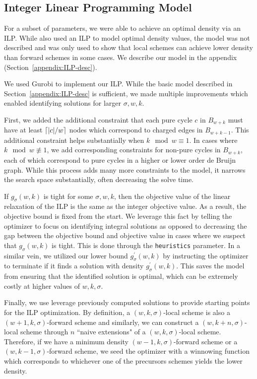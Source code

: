\documentclass{article}
\DeclarePairedDelimiter\ceil{\lceil}{\rceil}
\begin{document}
\subsection{Integer Linear Programming Model}
For a subset of parameters, we were able to achieve an optimal density via an ILP. While \cite{marccais2018asymptotically} also used an ILP to model optimal density values, the model was not described and was only used to show that local schemes can achieve lower density than forward schemes in some cases. We describe our model in the appendix (Section~\ref{appendix:ILP-desc}). 

We used Gurobi\citep{gurobi} to implement our ILP. While the basic model described in Section~\ref{appendix:ILP-desc} is sufficient, we made multiple improvements which enabled identifying solutions for larger $\sigma, w, k$. 

First, we added the additional constraint that each pure cycle $c$ in $B_{w+k}$  must have at least $\ceil*{{|c|}/{w}}$ nodes which correspond to charged edges in $B_{w+k-1}$. This additional constraint helps substantially when $k\mod w \equiv 1$. In cases where $k \mod w \not\equiv 1$, we add corresponding constraints for non-pure cycles in $B_{w+k}$, each of which correspond to pure cycles in a higher or lower order de Bruijn graph. While this process adds many more constraints to the model, it narrows the search space substantially, often decreasing the solve time.

If $g_\sigma(w, k)$ is tight for some $\sigma, w, k$, then the objective value of the linear relaxation of the ILP is the same as the integer objective value. As a result, the objective bound is fixed from the start. We leverage this fact by telling the optimizer to focus on identifying integral solutions as opposed to decreasing the gap between the objective bound and objective value in cases where we suspect that  $g_\sigma(w, k)$ is tight. This is done through the \texttt{heuristics} parameter. In a similar vein, we utilized our lower bound $g^\prime_\sigma(w,k)$ by instructing the optimizer to terminate if it finds a solution with density $g^\prime_\sigma(w,k)$. This saves the model from ensuring that the identified solution is optimal, which can be extremely costly at higher values of $w, k, \sigma$.

Finally, we use leverage previously computed solutions to provide starting points for the ILP optimization. By definition, a $(w, k, \sigma)$-local scheme is also a $(w+1, k, \sigma)$-forward scheme and similarly, we can construct a $(w, k+n, \sigma)$-local scheme through $n$ ``naive extensions" of a $(w, k, \sigma)$-local scheme\cite{marccais2018asymptotically}. Therefore, if we have a minimum density $(w-1, k, \sigma)$-forward scheme or a $(w, k-1, \sigma)$-forward scheme, we seed the optimizer with a winnowing function which corresponds to whichever one of the precursors schemes yields the lower density. 
\end{document}
